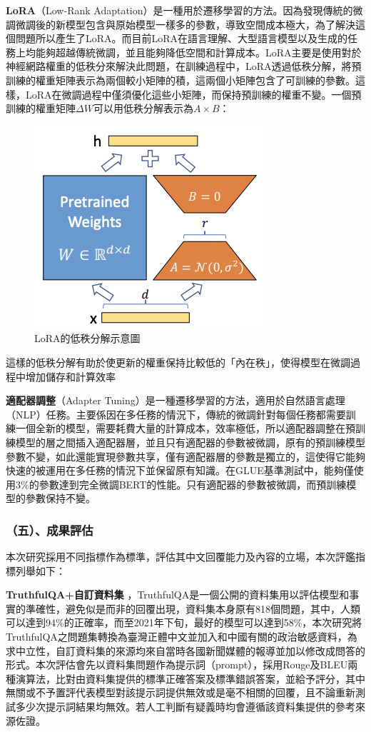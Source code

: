 \documentclass[12pt,a4paper,MingLiU,UTF8,natbib]{article}
\def\xeCJKembold{0.4}
\def\saveCJKnode{\dimen255\lastkern}
\def\restoreCJKnode{\kern-\dimen255\kern\dimen255}
\let\CJKoldsymbol\CJKsymbol
\let\CJKoldpunctsymbol\CJKpunctsymbol
\def\CJKfakeboldsymbol#1{%
	\special{pdf:literal direct 2 Tr \xeCJKembold\space w}%
	\CJKoldsymbol{#1}%
	\saveCJKnode
	\special{pdf:literal direct 0 Tr}%
	\restoreCJKnode}
\def\CJKfakeboldpunctsymbol#1{%
	\special{pdf:literal direct 2 Tr \xeCJKembold\space w}%
	\CJKoldpunctsymbol{#1}%
	\saveCJKnode
	\special{pdf:literal direct 0 Tr}%
	\restoreCJKnode}
\newcommand\CJKfakebold[1]{%
	\let\CJKsymbol\CJKfakeboldsymbol
	\let\CJKpunctsymbol\CJKfakeboldpunctsymbol
	#1%
	\let\CJKsymbol\CJKoldsymbol
	\let\CJKpunctsymbol\CJKoldpunctsymbol}
\begin{document}
	\textbf{LoRA}（Low-Rank Adaptation）是一種用於遷移學習的方法。因為發現傳統的微調微調後的新模型包含與原始模型一樣多的參數，導致空間成本極大，為了解決這個問題所以產生了LoRA。而目前LoRA在語言理解、大型語言模型以及生成的任務上均能夠超越傳統微調，並且能夠降低空間和計算成本。LoRA主要是使用對於神經網路權重的低秩分來解決此問題，在訓練過程中，LoRA透過低秩分解，將預訓練的權重矩陣表示為兩個較小矩陣的積，這兩個小矩陣包含了可訓練的參數。這樣，LoRA在微調過程中僅須優化這些小矩陣，而保持預訓練的權重不變。一個預訓練的權重矩陣$\Delta W$可以用低秩分解表示為$A×B$：
	\begin{figure}[H]
		\centering
	\includegraphics{20120468S5MbIQ5N0s}
	\caption{LoRA的低秩分解示意圖\protect\cite{hu2021lora}}
	\end{figure}
這樣的低秩分解有助於使更新的權重保持比較低的「內在秩」，使得模型在微調過程中增加儲存和計算效率\cite{hu2021lora}

	\textbf{適配器調整}（Adapter Tuning）是一種遷移學習的方法，適用於自然語言處理（NLP）任務。主要係因在多任務的情況下，傳統的微調針對每個任務都需要訓練一個全新的模型，需要耗費大量的計算成本，效率極低，所以適配器調整在預訓練模型的層之間插入適配器層，並且只有適配器的參數被微調，原有的預訓練模型參數不變，如此還能實現參數共享，僅有適配器層的參數是獨立的，這使得它能夠快速的被運用在多任務的情況下並保留原有知識。在GLUE基準測試中，能夠僅使用3\%的參數達到完全微調BERT的性能。只有適配器的參數被微調，而預訓練模型的參數保持不變。\cite{zhou2022efficiently}


	\subsubsection{（五）、成果評估}
	本次研究採用不同指標作為標準，評估其中文回覆能力及內容的立場，本次評鑑指標列舉如下：

	\CJKfakebold{\textbf{TruthfulQA+自訂資料集}}，TruthfulQA是一個公開的資料集用以評估模型和事實的準確性，避免似是而非的回覆出現，資料集本身原有818個問題，其中，人類可以達到94\%的正確率，而至2021年下旬，最好的模型可以達到58\%\cite{lin2022truthfulqa}，本次研究將TruthfulQA之問題集轉換為臺灣正體中文並加入和中國有關的政治敏感資料，為求中立性，自訂資料集的來源均來自當時各國新聞媒體的報導並加以修改成問答的形式。本次評估會先以資料集問題作為提示詞（prompt），採用Rouge及BLEU兩種演算法，比對由資料集提供的標準正確答案及標準錯誤答案，並給予評分，其中無關或不予置評代表模型對該提示詞提供無效或是毫不相關的回覆，且不論重新測試多少次提示詞結果均無效。若人工判斷有疑義時均會遵循該資料集提供的參考來源佐證。
\end{document}
